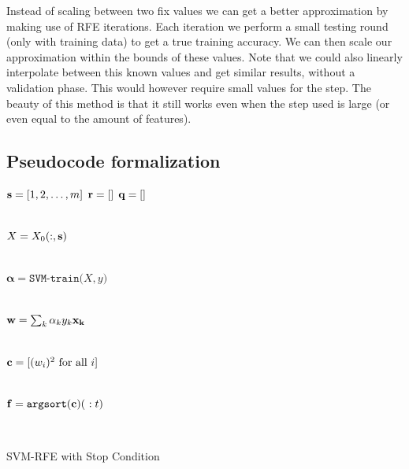 Instead of scaling between two fix values we can get a better approximation by making use of RFE iterations. Each iteration we perform a small testing round (only with training data) to get a true training accuracy. We can then scale our approximation within the bounds of these values. Note that we could also linearly interpolate between this known values and get similar results, without a validation phase. This would however require small values for the step. The beauty of this method is that it still works even when the step used is large (or even equal to the amount of features).

\subsection{Pseudocode formalization}

\begin{algorithm}[H]
    \DontPrintSemicolon
      $\mathbf{s} = [1,2, \dotsc, m]$ 
      $\mathbf{r} = []$ 
      $\mathbf{q} = []$ 
        {
            \\
            $X=X_0(:,\mathbf{s})$\VS

            \\
            $\boldsymbol{\alpha} = \texttt{SVM-train(} X, y \texttt{)}$\VS

            \\
            $\mathbf{w} = \sum_k{\alpha_k y_k \mathbf{x_k}}$\VS

            \\
            $\mathbf{c} = [(w_i)^2 \text{ for all $i$}]$\VS

            \\
            $\vt{f} = \texttt{argsort}(\vt{c})(\ :t)$\VS

            \\
        }
    \caption{SVM-RFE with Stop Condition}
    \label{alg:svmrfe.stopcond}
\end{algorithm}\VS\VS

